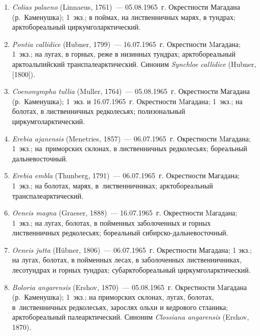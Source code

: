 \begin{enumerate}[noitemsep, leftmargin=0cm]

      \item \textit{Colias palaeno} (Linnaeus, 1761)~--- 05.08.1965~г. Окрестности Магадана (р.~Каменушка); 1~экз.; в поймах, на лиственничных марях, в тундрах; арктобореальный циркумголарктический.

      \item \textit{Pontia callidice} (Hubner, 1799)~--- 16.07.1965~г. Окрестности Mагадана; 1~экз.; на лугах, в горных, реже в низинных тундрах; арктобореальный арктоальпийский транспалеарктический. Синоним \textit{Synchloe callidice} (Hubner, [1800]).


      \item \textit{Coenonympha tullia} (Muller, 1764)~--- 05.08.1965~г. Окрестности Магадана (р.~Каменушка); 1~экз. и 16.07.1965~г. Окрестности Mагадана; 1~экз.; на болотах, в лиственничных редколесьях; полизональный циркумголарктический.

      \item \textit{Erebia ajanensis} (Menetries, 1857)~--- 06.07.1965~г. Окрестности Mагадана; 1~экз.; на~приморских склонах, в лиственничных редколесьях; бореальный дальневосточный.

      \item  \textit{Erebia embla} (Thunberg, 1791)~--- 06.07.1965~г. Окрестности Магадана; 1~экз.; на болотах, марях, в~лиственничниках; арктобореальный транспалеарктический.

      \item \textit{Oeneis magna} (Graeser, 1888)~--- 16.07.1965~г. Окрестности Mагадана; 1~экз.; на лугах, болотах, в пойменных заболоченных и горных лиственничных редколесьях; бореальный сибирско-дальневосточный.

      \item \textit{Oeneis jutta} (Hübner, 1806)~--- 06.07.1965~г. Окрестности Магадана; 1 экз.; на лугах, болотах, в пойменных лесах, в заболоченных лиственничниках, лесотундрах и горных тундрах; субарктобореальный циркумголарктический.


      \item \textit{Boloria angarensis} (Ershov, 1870)~--- 05.08.1965~г. Окрестности Mагадана (р.~Каменушка); 1~экз.; на приморских склонах, лугах, болотах, в~лиственничных редколесьях, зарослях ольхи и кедрового стланика; арктобореальный палеарктический. Синоним \textit{Clossiana angarensis} (Ershov, 1870).
\end{enumerate}


